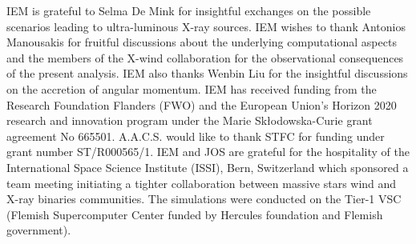 \documentclass{aa}
\begin{document}
%
%
%


\begin{acknowledgements}
IEM is grateful to Selma De Mink for insightful exchanges on the possible scenarios leading to ultra-luminous X-ray sources. IEM wishes to thank Antonios Manousakis for fruitful discussions about the underlying computational aspects and the members of the X-wind collaboration for the observational consequences of the present analysis. IEM also thanks Wenbin Liu for the insightful discussions on the accretion of angular momentum. IEM has received funding from the Research Foundation Flanders (FWO) and the European Union's Horizon 2020 research and innovation program under the Marie Sk\l odowska-Curie grant agreement No 665501. A.A.C.S. would like to thank STFC for funding under grant number ST/R000565/1. IEM and JOS are grateful for the hospitality of the International Space Science Institute (ISSI), Bern, Switzerland which sponsored a team meeting initiating a tighter collaboration between massive stars wind and X-ray binaries communities. The simulations were conducted on the Tier-1 VSC (Flemish Supercomputer Center funded by Hercules foundation and Flemish government).
\end{acknowledgements}



\begin{tiny}

\end{tiny}
\end{document}
